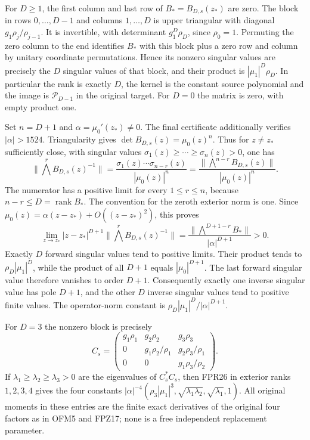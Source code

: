 \documentclass[11pt]{article}
\begin{document}
For $D\ge1$, the first column and last row of $B_*=B_{D,s}(z_*)$
are zero. The block in rows $0,\ldots,D-1$ and columns $1,\ldots,D$
is upper triangular with diagonal $g_1\rho_j/\rho_{j-1}$.
It is invertible, with determinant $g_1^D\rho_D$, since $\rho_0=1$.
Permuting the zero column to the end identifies $B_*$ with this
block plus a zero row and column by unitary coordinate permutations.
Hence its nonzero singular values are precisely the $D$ singular
values of that block, and their product is
$|\mu_1|^D\rho_D$. In particular the rank is exactly $D$, the
kernel is the constant source polynomial and the image is
$\mathcal P_{D-1}$ in the original target. For $D=0$ the matrix
is zero, with empty product one.

Set $n=D+1$ and $\alpha=\mu_0'(z_*)\ne0$. The final certificate
additionally verifies $|\alpha|>1524$.
Triangularity gives $\det B_{D,s}(z)=\mu_0(z)^n$.
Thus for $z\ne z_*$ sufficiently close, with singular values
$\sigma_1(z)\ge\cdots\ge\sigma_n(z)>0$, one has
\[
 \|\bigwedge^r B_{D,s}(z)^{-1}\|
 =\frac{\sigma_1(z)\cdots\sigma_{n-r}(z)}
        {|\mu_0(z)|^n}
 =\frac{\|\bigwedge^{n-r}B_{D,s}(z)\|}{|\mu_0(z)|^n}.
 \tag{FPR25}
\]
The numerator has a positive limit for every $1\le r\le n$,
because $n-r\le D=\operatorname{rank}B_*$. The convention for
the zeroth exterior norm is one. Since
$\mu_0(z)=\alpha(z-z_*)+O((z-z_*)^2)$, this proves
\[
 \lim_{z\to z_*}|z-z_*|^{D+1}
 \|\bigwedge^rB_{D,s}(z)^{-1}\|
 =\frac{\|\bigwedge^{D+1-r}B_*\|}{|\alpha|^{D+1}}>0.
 \tag{FPR26}
\]
Exactly $D$ forward singular values tend to positive limits.
Their product tends to $\rho_D|\mu_1|^D$, while the product
of all $D+1$ equals $|\mu_0|^{D+1}$. The last forward singular
value therefore vanishes to order $D+1$. Consequently exactly
one inverse singular value has pole $D+1$, and the other $D$
inverse singular values tend to positive finite values. The
operator-norm constant is
$\rho_D|\mu_1|^D/|\alpha|^{D+1}$.

For $D=3$ the nonzero block is precisely
\[
 C_s=\begin{pmatrix}
 g_1\rho_1&g_2\rho_2&g_3\rho_3\\
 0&g_1\rho_2/\rho_1&g_2\rho_3/\rho_1\\
 0&0&g_1\rho_3/\rho_2
 \end{pmatrix}.
 \tag{FPR27}
\]
If $\lambda_1\ge\lambda_2\ge\lambda_3>0$ are the eigenvalues
of $C_s^*C_s$, then FPR26 in exterior ranks $1,2,3,4$ gives
the four constants
$|\alpha|^{-4}(\rho_3|\mu_1|^3,
\sqrt{\lambda_1\lambda_2},\sqrt{\lambda_1},1)$.
All original moments in these entries are the finite exact
derivatives of the original four factors as in OFM5 and FPZ17;
none is a free independent replacement parameter.
\end{document}
